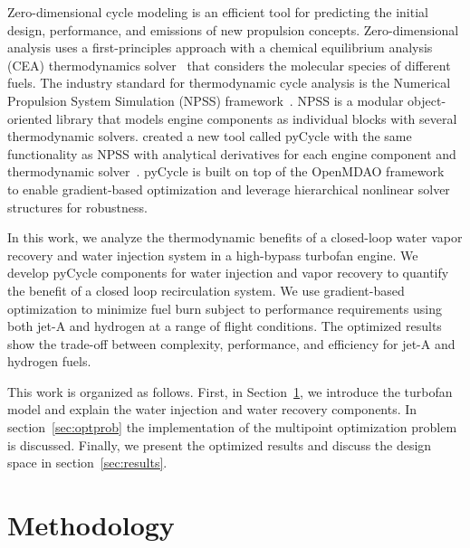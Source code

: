 \documentclass[conf]{new-aiaa}
\begin{document}
Zero-dimensional cycle modeling is an efficient tool for predicting the initial design, performance, and emissions of new propulsion concepts.
Zero-dimensional analysis uses a first-principles approach with a chemical equilibrium analysis (CEA) thermodynamics solver~\cite{Gordon1994} that considers the molecular species of different fuels.
The industry standard for thermodynamic cycle analysis is the Numerical Propulsion System Simulation (NPSS) framework~\cite{JonesNPSS}.
NPSS is a modular object-oriented library that models engine components as individual blocks with several thermodynamic solvers.
\citet{Hendricks2019} created a new tool called pyCycle with the same functionality as NPSS with analytical derivatives for each engine component and thermodynamic solver~\cite{Gray2017b}.
pyCycle is built on top of the OpenMDAO framework~\cite{Gray2019a} to enable gradient-based optimization and leverage hierarchical nonlinear solver structures for robustness.

In this work, we analyze the thermodynamic benefits of a closed-loop water vapor recovery and water injection system in a high-bypass turbofan engine.
We develop pyCycle components for water injection and vapor recovery to quantify the benefit of a closed loop recirculation system.
We use gradient-based optimization to minimize fuel burn subject to performance requirements using both jet-A and hydrogen at a range of flight conditions.
The optimized results show the trade-off between complexity, performance, and efficiency for jet-A and hydrogen fuels.

This work is organized as follows. First, in Section~\ref{sec:method}, we introduce the turbofan model and explain the water injection and water recovery components.
In section~\ref{sec:optprob} the implementation of the multipoint optimization problem is discussed.
Finally, we present the optimized results and discuss the design space in section~\ref{sec:results}.

\section{Methodology}
\label{sec:method}
\end{document}
